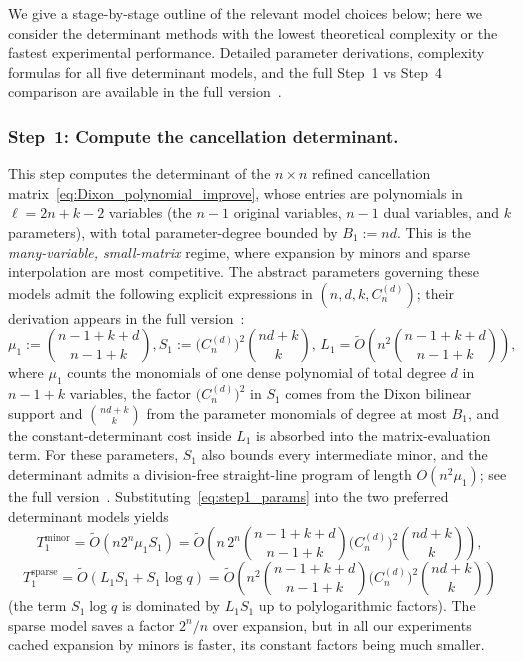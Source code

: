 We give a stage-by-stage outline of the relevant model choices below; here we consider the determinant methods with the lowest theoretical complexity or the fastest experimental performance. Detailed parameter derivations, complexity formulas for all five determinant models, and the full Step~1 vs Step~4 comparison are available in the full version~\cite{cryptoeprint:2026/1969}.

\subsubsection{Step~1: Compute the cancellation determinant.}
This step computes the determinant of the $n\times n$ refined cancellation matrix~\eqref{eq:Dixon_polynomial_improve}, whose entries are polynomials in $\ell=2n+k-2$ variables (the $n-1$ original variables, $n-1$ dual variables, and $k$ parameters), with total parameter-degree bounded by $B_1:=nd$. This is the \emph{many-variable, small-matrix} regime, where expansion by minors and sparse interpolation are most competitive. The abstract parameters governing these models admit the following explicit expressions in $(n,d,k,C_n^{(d)})$; their derivation appears in the full version~\cite{cryptoeprint:2026/1969}:
\begin{equation}
		\mu_1 := \binom{n-1+k+d}{n-1+k},\!
		S_1 := \bigl(C_n^{(d)}\bigr)^2\binom{nd+k}{k},\,
	L_1 = \widetilde{O}\!\left(n^2\binom{n-1+k+d}{n-1+k}\right),
	\label{eq:step1_params}
\end{equation}
where $\mu_1$ counts the monomials of one dense polynomial of total degree $d$ in $n-1+k$ variables, the factor $\bigl(C_n^{(d)}\bigr)^2$ in $S_1$ comes from the Dixon bilinear support and $\binom{nd+k}{k}$ from the parameter monomials of degree at most $B_1$, and the constant-determinant cost inside $L_1$ is absorbed into the matrix-evaluation term. For these parameters, $S_1$ also bounds every intermediate minor, and the determinant admits a division-free straight-line program of length $O(n^2\mu_1)$; see the full version~\cite{cryptoeprint:2026/1969}. Substituting~\eqref{eq:step1_params} into the two preferred determinant models yields
\begin{equation}
	T_{1}^{\mathrm{minor}}  = \widetilde{O}(n2^n\mu_1S_1) = \widetilde{O}\!\left(n\,2^n\binom{n-1+k+d}{n-1+k}\bigl(C_n^{(d)}\bigr)^2\binom{nd+k}{k}\right),
	\label{eq:step1_minor}
\end{equation}
\begin{equation}
	T_{1}^{\mathrm{sparse}} = \widetilde{O}(L_1S_1 + S_1\log q) = \widetilde{O}\!\left(n^2\binom{n-1+k+d}{n-1+k}\bigl(C_n^{(d)}\bigr)^2\binom{nd+k}{k}\right)
	\label{eq:step1_sparse}
\end{equation}
(the term $S_1\log q$ is dominated by $L_1S_1$ up to polylogarithmic factors). The sparse model saves a factor $2^n/n$ over expansion, but in all our experiments cached expansion by minors is faster, its constant factors being much smaller.

